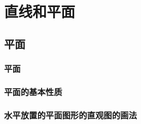 \chapter{直线和平面}
\section{平面}
\subsection{平面}
\begin{Practice}
  \begin{question}
    \item 
    \item 
  \end{question}
\end{Practice}
\subsection{平面的基本性质}
\begin{Practice}
  \begin{question}
    \item 
    \item 
    \item 
  \end{question}
\end{Practice}
\subsection{水平放置的平面图形的直观图的画法}
\begin{Practice}
  \begin{question}
    \item 
    \item 
  \end{question}
\end{Practice}
\begin{Exercise}
  \begin{question}
    \item 
    \item 
    \item 
    \item 
    \item 
    \item 
    \item 
    \item 
    \item 
    \item 
    \item 
  \end{question}
\end{Exercise}
